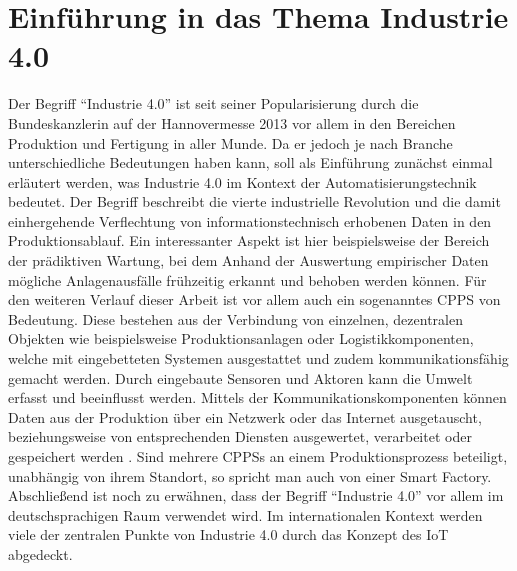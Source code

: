 \chapter{Einführung in das Thema Industrie 4.0}

Der Begriff "`Industrie 4.0"' ist seit seiner Popularisierung durch die Bundeskanzlerin auf der Hannovermesse 2013 vor allem in den Bereichen Produktion und Fertigung in aller Munde. Da er jedoch je nach Branche unterschiedliche Bedeutungen haben kann, soll als Einführung zunächst einmal erläutert werden, was Industrie 4.0 im Kontext der Automatisierungstechnik bedeutet.
Der Begriff beschreibt die vierte industrielle Revolution und die damit einhergehende Verflechtung von informationstechnisch erhobenen Daten in den Produktionsablauf. Ein interessanter Aspekt ist hier beispielsweise der Bereich der prädiktiven Wartung, bei dem Anhand der Auswertung empirischer Daten mögliche Anlagenausfälle frühzeitig erkannt und behoben werden können.
Für den weiteren Verlauf dieser Arbeit ist vor allem auch ein sogenanntes \ac{CPPS} von Bedeutung. Diese bestehen aus der Verbindung von einzelnen, dezentralen Objekten wie beispielsweise Produktionsanlagen oder Logistikkomponenten, welche mit eingebetteten Systemen ausgestattet und zudem kommunikationsfähig gemacht werden. Durch eingebaute Sensoren und Aktoren kann die Umwelt erfasst und beeinflusst werden. Mittels der Kommunikationskomponenten können Daten aus der Produktion über ein Netzwerk oder das Internet ausgetauscht, beziehungsweise von entsprechenden Diensten ausgewertet, verarbeitet oder gespeichert werden
\cite{Bauerhansl2014}.
Sind mehrere \aclp{CPPS} an einem Produktionsprozess beteiligt, unabhängig von ihrem Standort, so spricht man auch von einer Smart Factory.
Abschließend ist noch zu erwähnen, dass der Begriff "`Industrie 4.0"' vor allem im deutschsprachigen Raum verwendet wird. Im internationalen Kontext werden viele der zentralen Punkte von Industrie 4.0 durch das Konzept des \ac{IoT} abgedeckt.
\clearpage




